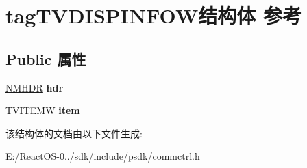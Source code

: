 \hypertarget{structtag_t_v_d_i_s_p_i_n_f_o_w}{}\section{tag\+T\+V\+D\+I\+S\+P\+I\+N\+F\+O\+W结构体 参考}
\label{structtag_t_v_d_i_s_p_i_n_f_o_w}
\subsection*{Public 属性}
\begin{DoxyCompactItemize}
\item 
\mbox{\label{structtag_t_v_d_i_s_p_i_n_f_o_w_aa2d47026828ac9642bb66c3c3e8dc9cd}} 
\hyperlink{structtag_n_m_h_d_r}{N\+M\+H\+DR} {\bfseries hdr}
\item 
\mbox{\label{structtag_t_v_d_i_s_p_i_n_f_o_w_a6874edb29d618c7c12114bd25e8f84bd}} 
\hyperlink{structtag_t_v_i_t_e_m_w}{T\+V\+I\+T\+E\+MW} {\bfseries item}
\end{DoxyCompactItemize}


该结构体的文档由以下文件生成\+:\begin{DoxyCompactItemize}
\item 
E\+:/\+React\+O\+S-\/0../sdk/include/psdk/commctrl.\+h\end{DoxyCompactItemize}
